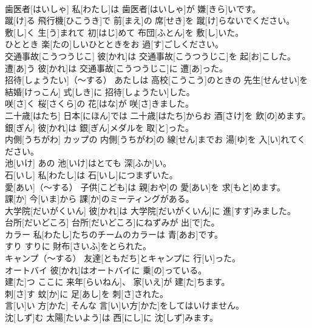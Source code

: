 \documentclass[8pt]{extreport}
\begin{document}
\begin{CJK}{UTF8}{min}
\\	歯医者[はいしゃ]	私[わたし]は 歯医者[はいしゃ]が 嫌[きら]いです。		
\\	蹴[け]る	飛行機[ひこうき]で 前[まえ]の 席[せき]を 蹴[け]らないでください。		
\\	敷[し]く	生[う]まれて 初[はじ]めて 布団[ふとん]を 敷[し]いた。		
\\	ひととき	楽[たの]しいひとときをお 過[す]ごしください。		
\\	交通事故[こうつうじこ]	彼[かれ]は 交通事故[こうつうじこ]を 起[お]こした。		
\\	遭[あ]う	彼[かれ]は 交通事故[こうつうじこ]に 遭[あ]った。		
\\	招待[しょうたい]（～する）	あたしは 高校[こうこう]のときの 先生[せんせい]を 結婚[けっこん] 式[しき]に 招待[しょうたい]した。		
\\	咲[さ]く	桜[さくら]の 花[はな]が 咲[さ]きました。		
\\	二十歳[はたち]	日本[にほん]では 二十歳[はたち]からお 酒[さけ]を 飲[の]めます。		
\\	銀[ぎん]	彼[かれ]は 銀[ぎん]メダルを 取[と]った。		
\\	内側[うちがわ]	カップの 内側[うちがわ]の 線[せん]までお 湯[ゆ]を 入[い]れてください。		
\\	池[いけ]	あの 池[いけ]はとても 深[ふか]い。		
\\	石[いし]	私[わたし]は 石[いし]につまずいた。		
\\	愛[あい]（～する）	子供[こども]は 親[おや]の 愛[あい]を 求[もと]めます。		
\\	課[か]	今[いま]から 課[か]のミーティングがある。		
\\	大学院[だいがくいん]	彼[かれ]は 大学院[だいがくいん]に 進[すす]みました。		
\\	台所[だいどころ]	台所[だいどころ]にねずみが 出[で]た。		
\\	カラー	私[わたし]たちのチームのカラーは 青[あお]です。		
\\	すり	すりに 財布[さいふ]をとられた。		
\\	キャンプ（～する）	友達[ともだち]とキャンプに 行[い]った。		
\\	オートバイ	彼[かれ]はオートバイに 乗[の]っている。		
\\	建[た]つ	ここに 来年[らいねん]、 家[いえ]が 建[た]ちます。		
\\	刺[さ]す	蚊[か]に 足[あし]を 刺[さ]された。		
\\	言[い]い 方[かた]	そんな 言[い]い方[かた]をしてはいけません。		
\\	沈[しず]む	太陽[たいよう]は 西[にし]に 沈[しず]みます。		

\end{CJK}
\end{document}
